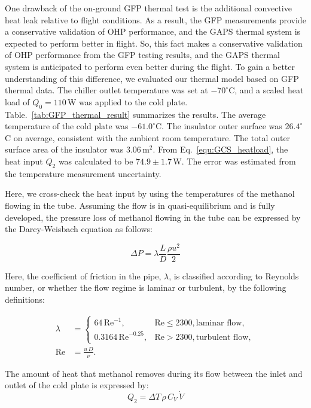 One drawback of the on-ground \ac{GFP} thermal test is the additional convective heat leak relative to flight conditions. As a result, the \ac{GFP} measurements provide a conservative validation of \ac{OHP} performance, and the \ac{GAPS} thermal system is expected to perform better in flight. So, this fact makes a conservative validation of \ac{OHP} performance from the \ac{GFP} testing results, and the \ac{GAPS} thermal system is anticipated to perform even better during the flight. To gain a better understanding of this difference, we evaluated our thermal model based on \ac{GFP} thermal data. The chiller outlet temperature was set at $-70^\circ$C, and a scaled heat load of $Q_0 = 110 \, \text{W}$ was applied to the cold plate. Table.~\ref{tab:GFP_thermal_result} summarizes the results. The average temperature of the cold plate was $-61.0^\circ$C. The insulator outer surface was $26.4^\circ$C on average, consistent with the ambient room temperature. The total outer surface area of the insulator was $3.06 \, \text{m}^2$. From Eq.~\ref{equ:GCS_heatload}, the heat input $Q_2$ was calculated to be $74.9 \pm 1.7 \, \text{W}$. The error was estimated from the temperature measurement uncertainty.

Here, we cross-check the heat input by using the temperatures of the methanol flowing in the tube. Assuming the flow is in quasi-equilibrium and is fully developed, the pressure loss of methanol flowing in the tube can be expressed by the Darcy-Weisbach equation as follows:

\begin{equation}\label{equ:DWpressureloss}
    \Delta P = \lambda \frac{L}{D} \frac{\rho u^2}{2}
\end{equation}

Here, the coefficient of friction in the pipe, $\lambda$, is classified according to Reynolds number, or whether the flow regime is laminar or turbulent, by the following definitions:

\begin{align}\label{equ:friction_coefficient}
\lambda &= 
\begin{cases}
64 \, \text{Re}^{-1}, & \text{Re} \leq 2300, \text{laminar flow}, \\
0.3164 \, \text{Re}^{-0.25}, & \text{Re} > 2300, \text{turbulent flow},
\end{cases} \\
\text{Re} &= \frac{u \, D}{\nu}.
\end{align}

The amount of heat that methanol removes during its flow between the inlet and outlet of the cold plate is expressed by:
\begin{equation}\label{equ:heat_removal}
Q_2 = \Delta T \, \rho \, C_V \, \dot{V}
\end{equation}

